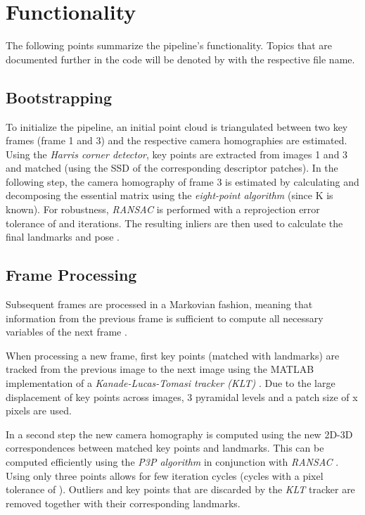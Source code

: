 \chapter{Functionality}
The following points summarize the pipeline's functionality. 
Topics that are documented further in the code will be denoted by  with the respective file name.

\section{Bootstrapping}
To initialize the pipeline, an initial point cloud is triangulated between two key frames (frame 1 and 3) and the respective camera homographies are estimated. 
Using the \emph{Harris corner detector}, key points are extracted from images 1 and 3 and matched (using the SSD of the corresponding descriptor patches).
In the following step, the camera homography of frame 3 is estimated by calculating and decomposing the essential matrix using the \emph{eight-point algorithm} (since K is known). 
For robustness, \emph{RANSAC} is performed with a reprojection error tolerance of \ransacPixelTolerance and \ransacNumIterations iterations. 
The resulting inliers are then used to calculate the final landmarks and pose .      

\section{Frame Processing}
Subsequent frames are processed in a Markovian fashion, meaning that information from the previous frame is sufficient to compute all necessary variables of the next frame . \par
When processing a new frame, first key points (matched with landmarks) are tracked from the previous image to the next image using the MATLAB implementation of a \emph{Kanade-Lucas-Tomasi tracker (KLT)} . 
Due to the large displacement of key points across images, 3 pyramidal levels and a patch size of \trackerBlocksize x \trackerBlocksize pixels are used. \par
In a second step the new camera homography is computed using the new 2D-3D correspondences between matched key points and landmarks. 
This can be computed efficiently using the \emph{P3P algorithm} in conjunction with \emph{RANSAC} . 
Using only three points allows for few iteration cycles (\ransacNumIterations cycles with a pixel tolerance of \ransacPixelTolerance). 
Outliers and key points that are discarded by the \emph{KLT} tracker are removed together with their corresponding landmarks.\par

